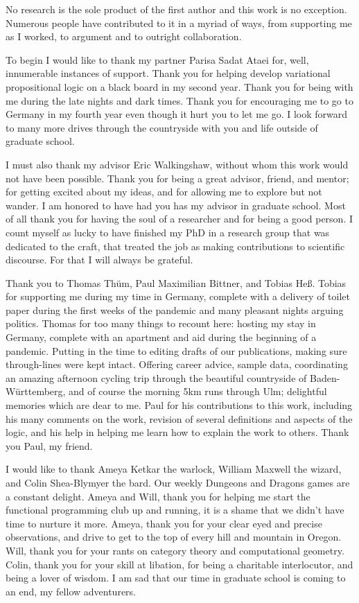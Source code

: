 No research is the sole product of the first author and this work is no
exception. Numerous people have contributed to it in a myriad of ways, from
supporting me as I worked, to argument and to outright collaboration.

To begin I would like to thank my partner Parisa Sadat Ataei for, well,
innumerable instances of support. Thank you for helping develop variational
propositional logic on a black board in my second year. Thank you for being with
me during the late nights and dark times. Thank you for encouraging me to go to
Germany in my fourth year even though it hurt you to let me go. I look forward
to many more drives through the countryside with you and life outside of
graduate school.

I must also thank my advisor Eric Walkingshaw, without whom this work would not
have been possible. Thank you for being a great advisor, friend, and mentor; for
getting excited about my ideas, and for allowing me to explore but not wander. I
am honored to have had you has my advisor in graduate school. Most of all thank
you for having the soul of a researcher and for being a good person. I count
myself as lucky to have finished my PhD in a research group that was dedicated
to the craft, that treated the job as making contributions to scientific
discourse. For that I will always be grateful.

Thank you to Thomas Thüm, Paul Maximilian Bittner, and Tobias Heß. Tobias for
supporting me during my time in Germany, complete with a delivery of toilet
paper during the first weeks of the pandemic and many pleasant nights arguing
politics. Thomas for too many things to recount here: hosting my stay in
Germany, complete with an apartment and aid during the beginning of a pandemic.
Putting in the time to editing drafts of our publications, making sure
through-lines were kept intact. Offering career advice, sample data,
coordinating an amazing afternoon cycling trip through the beautiful countryside
of Baden-Württemberg, and of course the morning 5km runs through Ulm; delightful
memories which are dear to me. Paul for his contributions to this work,
including his many comments on the work, revision of several definitions and
aspects of the logic, and his help in helping me learn how to explain the work
to others. Thank you Paul, my friend.

I would like to thank Ameya Ketkar the warlock, William Maxwell the wizard, and
Colin Shea-Blymyer the bard. Our weekly Dungeons and Dragons games are a
constant delight. Ameya and Will, thank you for helping me start the functional
programming club up and running, it is a shame that we didn't have time to
nurture it more. Ameya, thank you for your clear eyed and precise observations,
and drive to get to the top of every hill and mountain in Oregon. Will, thank
you for your rants on category theory and computational geometry. Colin, thank
you for your skill at libation, for being a charitable interlocutor, and being a
lover of wisdom. I am sad that our time in graduate school is coming to an end,
my fellow adventurers.

